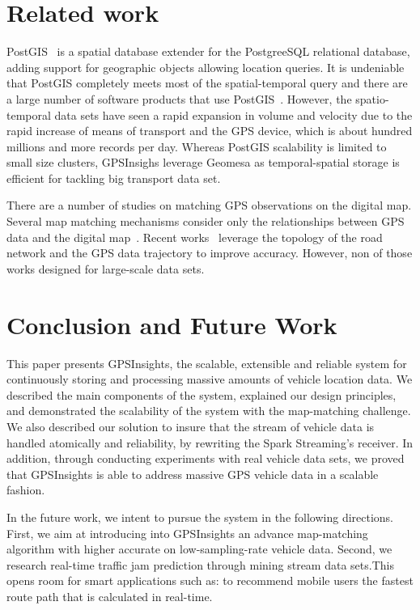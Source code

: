 \documentclass{sig-alternate-05-2015}
\begin{document}
\section{Related work}

PostGIS~\cite{posgis} is a spatial database extender for the PostgreeSQL relational database, adding support for geographic objects allowing location queries. It is undeniable that PostGIS completely meets most of the spatial-temporal query and there are a large number of software products that use PostGIS~\cite{backendposgis}. However, the spatio-temporal data sets have seen a rapid expansion in volume and velocity due to the rapid increase of means of transport and the GPS device, which is about hundred millions and more records per day. Whereas PostGIS scalability is limited to small size clusters, GPSInsighs leverage Geomesa as temporal-spatial storage is efficient for tackling big transport data set.

There are a number of studies on matching GPS observations on the digital map. Several map matching mechanisms consider only the relationships between GPS data and the digital map~\cite{noh1998map}. Recent works~\cite{yang2005map} leverage the topology of the road network and the GPS data trajectory to improve accuracy. However, non of those works designed for large-scale data sets.  

\section{Conclusion and Future Work}

This paper presents GPSInsights, the scalable, extensible and reliable system for continuously storing and processing massive amounts of vehicle location data. We described the main components of the system, explained our design principles, and demonstrated the scalability of the system with the map-matching challenge. We also described our solution to insure that the stream of vehicle data is handled atomically and reliability, by rewriting the Spark Streaming's receiver. In addition, through conducting experiments with real vehicle data sets, we proved that GPSInsights is able to address massive GPS vehicle data in a scalable fashion.

In the future work, we intent to pursue the system in the following directions. First, we aim at introducing into GPSInsights an advance map-matching algorithm with higher accurate on low-sampling-rate vehicle data. Second, we research real-time traffic jam prediction through mining stream data sets.This opens room for smart applications such as: to recommend mobile users the fastest route path that is calculated in real-time.
\end{document}
